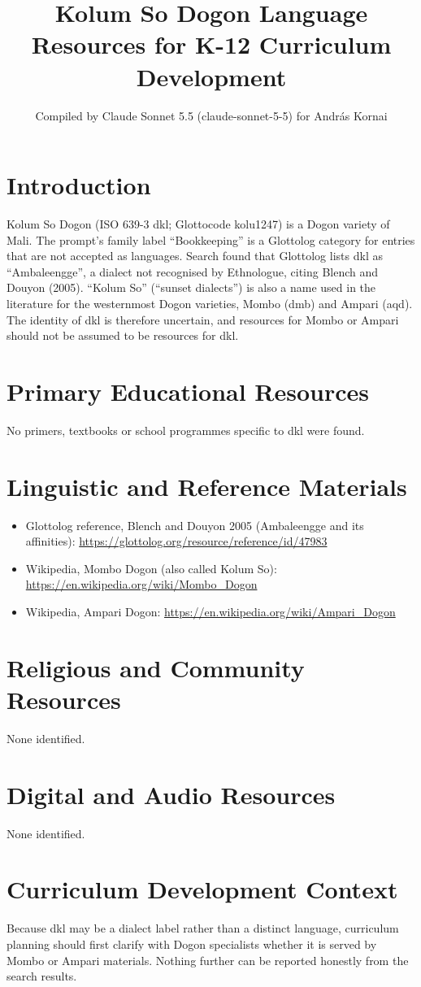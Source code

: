 \documentclass[12pt]{article}
\title{Kolum So Dogon Language Resources for K-12 Curriculum Development}
\author{Compiled by Claude Sonnet 5.5 (claude-sonnet-5-5) for Andr\'as Kornai}
\date{}
\begin{document}
\maketitle

\section{Introduction}
Kolum So Dogon (ISO 639-3 dkl; Glottocode kolu1247) is a Dogon variety of Mali. The prompt's family label ``Bookkeeping'' is a Glottolog category for entries that are not accepted as languages. Search found that Glottolog lists dkl as ``Ambaleengge'', a dialect not recognised by Ethnologue, citing Blench and Douyon (2005). ``Kolum So'' (``sunset dialects'') is also a name used in the literature for the westernmost Dogon varieties, Mombo (dmb) and Ampari (aqd). The identity of dkl is therefore uncertain, and resources for Mombo or Ampari should not be assumed to be resources for dkl.

\section{Primary Educational Resources}
No primers, textbooks or school programmes specific to dkl were found.

\section{Linguistic and Reference Materials}
\begin{itemize}
\item Glottolog reference, Blench and Douyon 2005 (Ambaleengge and its affinities): \url{https://glottolog.org/resource/reference/id/47983}
\item Wikipedia, Mombo Dogon (also called Kolum So): \url{https://en.wikipedia.org/wiki/Mombo_Dogon}
\item Wikipedia, Ampari Dogon: \url{https://en.wikipedia.org/wiki/Ampari_Dogon}
\end{itemize}

\section{Religious and Community Resources}
None identified.

\section{Digital and Audio Resources}
None identified.

\section{Curriculum Development Context}
Because dkl may be a dialect label rather than a distinct language, curriculum planning should first clarify with Dogon specialists whether it is served by Mombo or Ampari materials. Nothing further can be reported honestly from the search results.
\end{document}

